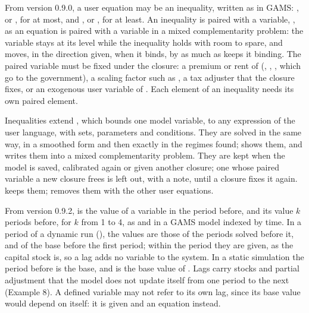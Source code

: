 From version 0.9.0, a user equation may be an inequality, written as in GAMS:
  , or \cmd{<=}, for at most, and 
 , or \cmd{>=}, for at least. An inequality is paired with
a variable, \cmd{)}, as an equation is paired with a
variable in a mixed complementarity problem: the variable stays at its level
while the inequality holds with room to spare, and moves, in the direction
given, when it binds, by as much as keeps it binding. The paired variable must
be fixed under the closure: a premium or rent of 
(, , , which go to the government), a scaling factor
such as , a tax adjuster that the closure fixes, or an exogenous user
variable of . Each element of an inequality needs its own
paired element.

Inequalities extend , which bounds one model variable,
to any expression of the user language, with sets, parameters and conditions.
They are solved in the same way, in a smoothed form and then exactly in the
regimes found;  shows them, and 
writes them into a mixed complementarity problem. They are kept when the
model is saved, calibrated again or given another closure; one whose paired
variable a new closure frees is left out, with a note, until a closure fixes
it again.  keeps them; 
removes them with the other user equations.


From version 0.9.2, \cmd{)} is the value of a variable in
the period before, and \cmd{(}\cmd{),} \cmd{)}
its value $k$ periods before, for $k$ from 1 to 4, as  and
\cmd{)} in a GAMS model indexed by time. In a
period of a dynamic run (), the values are those of the
periods solved before it, and of the base before the first period; within the
period they are given, as the capital stock is, so a lag adds no variable to
the system. In a static simulation the period before is the base, and
\cmd{)} is the base value of . Lags carry stocks
and partial adjustment that the model does not update itself from one period
to the next (Example 8). A defined variable may not refer to its own lag,
since its base value would depend on itself: it is given  and an
equation instead.

